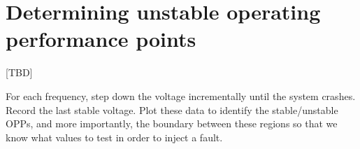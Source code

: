 \section{Determining unstable operating performance points}
\label{sec:unstableOPPs}

[TBD]

For each frequency, step down the voltage incrementally until the system
crashes. Record the last stable voltage. Plot these data to identify the
stable/unstable OPPs, and more importantly, the boundary between these regions
so that we know what values to test in order to inject a fault.

